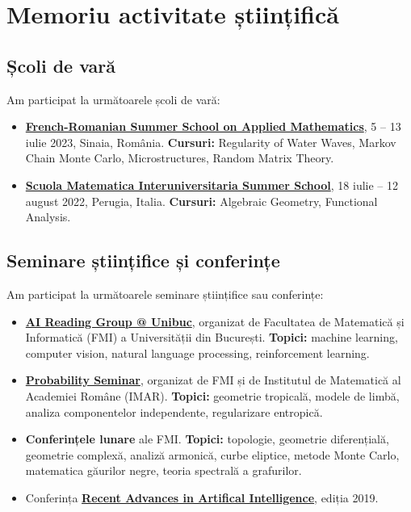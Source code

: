 
\section*{Memoriu activitate științifică}

\subsection*{Școli de vară}

Am participat la următoarele școli de vară:

\begin{itemize}
    \item \href{https://sites.google.com/site/marinliviu/french-romanian-summer-school-on-applied-mathematics/8th-french-romanian-summer-school-on-applied-mathematics-5-13-july-2023?authuser=0}{\textbf{French-Romanian Summer School on Applied Mathematics}}, 5 -- 13 iulie 2023, Sinaia, România. \textbf{Cursuri:} Regularity of Water Waves, Markov Chain Monte Carlo, Microstructures, Random Matrix Theory.

    \item \href{https://www.smi-math.unipr.it/past-courses/perugia/summer-school-smi-2022/100/}{\textbf{Scuola Matematica Interuniversitaria Summer School}}, 18 iulie -- 12 august 2022, Perugia, Italia. \textbf{Cursuri:} Algebraic Geometry, Functional Analysis.
\end{itemize}

\subsection*{Seminare științifice și conferințe}

Am participat la următoarele seminare științifice sau conferințe:

\begin{itemize}
    \item \href{https://sites.google.com/view/ai-unibuc/home}{\textbf{AI Reading Group @ Unibuc}},  organizat de Facultatea de Matematică și Informatică (FMI) a Universității din București. \textbf{Topici:} machine learning, computer vision, natural language processing, reinforcement learning.
    
    \item \href{https://sites.google.com/view/master-probabilitati-fmi/seminarul-stiintific-probabilitati-si-teme-conexe}{\textbf{Probability Seminar}}, organizat de FMI și de Institutul de Matematică al Academiei Române (IMAR). \textbf{Topici:} geometrie tropicală, modele de limbă, analiza componentelor independente, regularizare entropică.

    \item \textbf{Conferințele lunare} ale FMI. \textbf{Topici:} topologie, geometrie diferențială, geometrie complexă, analiză armonică, curbe eliptice, metode Monte Carlo, matematica găurilor negre, teoria spectrală a grafurilor.

    \item Conferința \href{https://nlp.unibuc.ro/events/raai2019.html}{\textbf{Recent Advances in Artifical Intelligence}}, ediția 2019.
\end{itemize}

